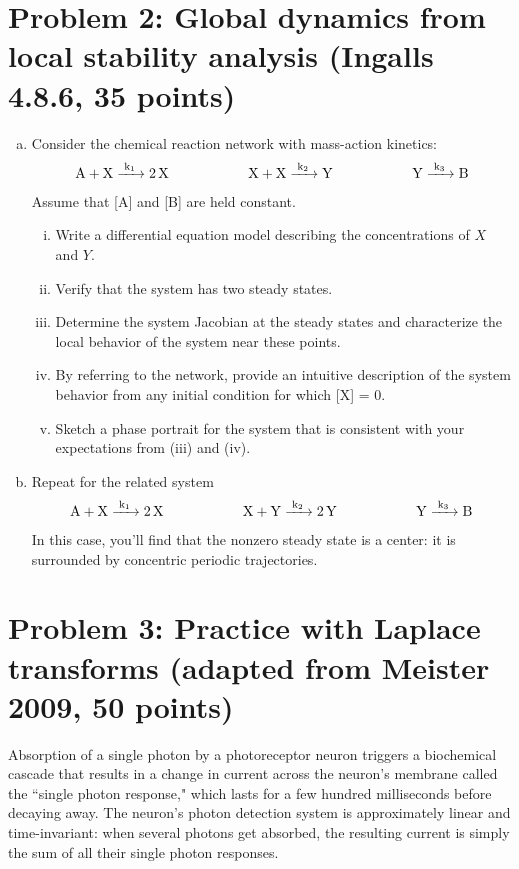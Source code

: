 \documentclass{article}
\begin{document}
\section*{Problem 2: Global dynamics from local stability analysis (Ingalls 4.8.6, 35 points)}

\begin{enumerate}[a)]
\setlength{\itemsep}{0pt}
\item Consider the chemical reaction network with mass-action kinetics:
\begin{eqnarray*}
\ce{A + X ->[k_1] 2 X} \hspace{2 cm} \ce{X + X ->[k_2] Y}  \hspace{2 cm} \ce{Y ->[k_3] B} 
\end{eqnarray*}
Assume that [A] and [B] are held constant.
\begin{enumerate}[i)]
\setlength{\itemsep}{0pt}
\item Write a differential equation model describing the concentrations of $X$ and $Y$.
\item Verify that the system has two steady states.
\item Determine the system Jacobian at the steady states and characterize the local behavior of the system near these points.
\item By referring to the network, provide an intuitive description of the system behavior from any initial condition for which [X] = 0.
\item Sketch a phase portrait for the system that is consistent with your expectations from (iii) and (iv).
\end{enumerate}
\item Repeat for the related system
\begin{eqnarray*}
\ce{A + X ->[k_1] 2 X} \hspace{2 cm} \ce{X + Y ->[k_2] 2Y}  \hspace{2 cm} \ce{Y ->[k_3] B} 
\end{eqnarray*}
In this case, you'll find that the nonzero steady state is a center: it is surrounded by concentric periodic trajectories.
\end{enumerate}

\section*{Problem 3: Practice with Laplace transforms (adapted from Meister 2009, 50 points)}

Absorption of a single photon by a photoreceptor neuron triggers a biochemical cascade that results in a change in current across the neuron's membrane called the ``single photon response," which lasts for a few hundred milliseconds before decaying away. The neuron's photon detection system is approximately linear and time-invariant: when several photons get absorbed, the resulting current is simply the sum of all their single photon responses.
\end{document}
